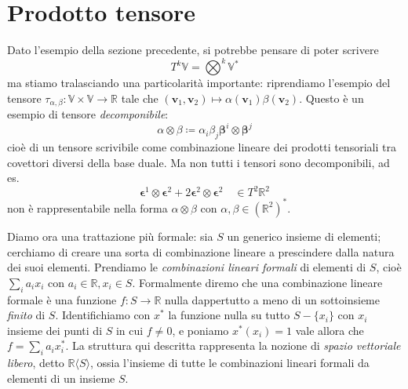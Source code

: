 \section{Prodotto tensore}
Dato l'esempio della sezione precedente, si potrebbe pensare di poter scrivere
\[
    T^k\mathbb{V} = \bigotimes^k \mathbb{V}^*
\]
ma stiamo tralasciando una particolarità importante: riprendiamo l'esempio del tensore $\tau_{\alpha, \beta} : \mathbb{V} \times \mathbb{V} \longrightarrow \mathbb{R}$ tale che $(\mathbf{v}_1, \mathbf{v}_2) \mapsto \alpha(\mathbf{v}_1) \beta(\mathbf{v}_2)$. Questo è un esempio di tensore \emph{decomponibile}:
\[
    \alpha \otimes \beta \coloneqq \alpha_i \beta_j \bm{\beta}^i \otimes \bm{\beta}^j
\]
cioè di un tensore scrivibile come combinazione lineare dei prodotti tensoriali tra covettori diversi della base duale.
Ma non tutti i tensori sono decomponibili, ad es.
\[
    \bm{\epsilon}^1 \otimes \bm{\epsilon}^2 + 2 \bm{\epsilon}^2 \otimes \bm{\epsilon}^2 \quad \in T^2\mathbb{R}^2
\]
non è rappresentabile nella forma $\alpha \otimes \beta$ con $\alpha, \beta \in (\mathbb{R}^2)^*$.

Diamo ora una trattazione più formale: sia $S$ un generico insieme di elementi; cerchiamo di creare una sorta di combinazione lineare a prescindere dalla natura dei suoi elementi.
Prendiamo le \emph{combinazioni lineari formali} di elementi di $S$, cioè $\sum_i a_i x_i$ con $a_i \in \mathbb{R}, x_i \in S$.
Formalmente diremo che una combinazione lineare formale è una funzione $f : S \longrightarrow \mathbb{R}$ nulla dappertutto a meno di un sottoinsieme \emph{finito} di $S$.
Identifichiamo con $x^*$ la funzione nulla su tutto $S - \{ x_i \}$ con $x_i$ insieme dei punti di $S$ in cui $f \neq 0$, e poniamo $x^* (x_i)= 1$ vale allora che $f= \sum_i a_i x_i^*$.
La struttura qui descritta rappresenta la nozione di \emph{spazio vettoriale libero}, detto $\mathbb{R} \langle S \rangle$, ossia l'insieme di tutte le combinazioni lineari formali da elementi di un insieme $S$.

